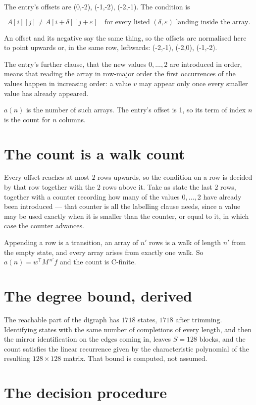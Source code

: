 \documentclass[11pt]{article}
\theoremstyle{definition}
\begin{document}
The entry's offsets are (0,-2), (-1,-2), (-2,-1). The condition is

\[A[i][j] \ne A[i{+}\delta][j{+}\varepsilon]\quad\text{for every listed }(\delta,\varepsilon)\text{ landing inside the array.}\]

An offset and its negative say the same thing, so the offsets are normalised here to point upwards or, in the same row, leftwards: (-2,-1), (-2,0), (-1,-2).

The entry's further clause, that the new values $0,\dots,2$ are introduced in order, means that reading the array in row-major order the first occurrences of the values happen in increasing order: a value $v$ may appear only once every smaller value has already appeared.

$a(n)$ is the number of such arrays. The entry's offset is 1, so its term of index $n$ is the count for $n$ columns.

\section{The count is a walk count}

Every offset reaches at most $2$ rows upwards, so the condition on a row is decided by that row together with the $2$ rows above it. Take as state the last $2$ rows, together with a counter recording how many of the values $0,\dots,2$ have already been introduced --- that counter is all the labelling clause needs, since a value may be used exactly when it is smaller than the counter, or equal to it, in which case the counter advances.

Appending a row is a transition, an array of $n'$ rows is a walk of length $n'$ from the empty state, and every array arises from exactly one walk. So $a(n) = w^{\mathsf T}M^{\,n'}f$ and the count is C-finite.

\section{The degree bound, derived}

The reachable part of the digraph has $1718$ states, $1718$ after trimming. Identifying states with the same number of completions of every length, and then the mirror identification on the edges coming in, leaves $S = 128$ blocks, and the count satisfies the linear recurrence given by the characteristic polynomial of the resulting $128\times128$ matrix. That bound is computed, not assumed.

\section{The decision procedure}
\end{document}
